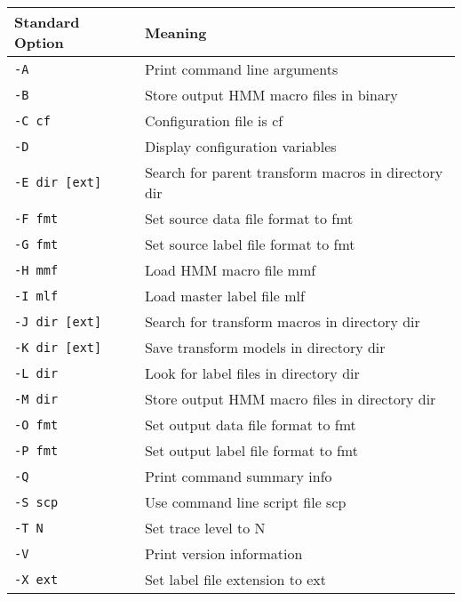 \vspace*{1cm}
\begin{center}
\begin{tabular}{|p{2.6cm}|p{8.2cm}|} \hline
Standard Option &   Meaning  \\ \hline
\texttt{-A}     &   Print command line arguments\\
\texttt{-B}     &  Store output HMM macro files in binary \\
\texttt{-C cf}  &   Configuration file is cf \\
\texttt{-D}     &   Display configuration variables\\
\texttt{-E dir [ext]}  &  Search for parent transform macros in directory dir \\
\texttt{-F fmt}  &  Set source data file format to fmt \\
\texttt{-G fmt}  &  Set source label file format to fmt \\
\texttt{-H mmf}  &  Load HMM macro file mmf \\
\texttt{-I mlf}  &  Load master label file mlf \\
\texttt{-J dir [ext]}  &  Search for transform macros in directory dir \\
\texttt{-K dir [ext]}  &  Save transform models in directory dir  \\
\texttt{-L dir}  &  Look for label files in directory dir \\
\texttt{-M dir}  &  Store output HMM macro files in directory dir \\
\texttt{-O fmt}  &  Set output data file format to fmt \\
\texttt{-P fmt}  &  Set output label file format to fmt \\
\texttt{-Q}     &   Print command summary info\\
\texttt{-S scp}  &   Use command line script file scp \\
\texttt{-T N}  &   Set trace level to N \\
\texttt{-V}     &   Print version information\\
\texttt{-X ext} &   Set label file extension to ext \\ \hline
\end{tabular}
\end{center}


